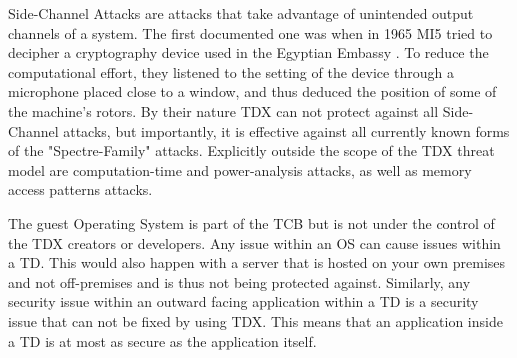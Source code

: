 Side-Channel Attacks are attacks that take advantage of unintended output channels of a system. The first documented one was when in 1965 MI5 tried to decipher a cryptography device used in the Egyptian Embassy \cite{zhou_side-channel_nodate}. To reduce the computational effort, they listened to the setting of the device through a microphone placed close to a window, and thus deduced the position of some of the machine's rotors.
By their nature TDX can not protect against all Side-Channel attacks, but importantly, it is effective against all currently known forms of the "Spectre-Family" attacks. Explicitly outside the scope of the TDX threat model are computation-time and power-analysis attacks, as well as memory access patterns attacks.


The guest Operating System is part of the \Gls{TCB} but is not under the control of the TDX creators or developers. Any issue within an \Gls{OS} can cause issues within a \Gls{TD}. This would also happen with a server that is hosted on your own premises and not off-premises and is thus not being protected against. Similarly, any security issue within an outward facing application within a \Gls{TD} is a security issue that can not be fixed by using TDX. This means that an application inside a TD is at most as secure as the application itself. 


